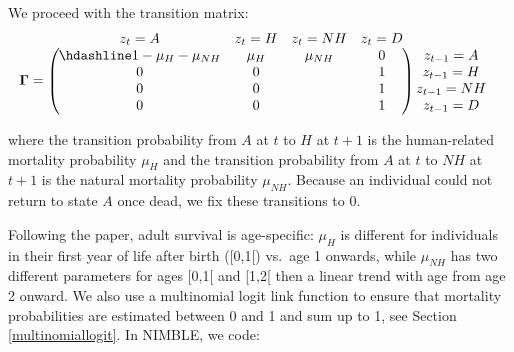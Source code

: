 \documentclass[
  12pt,
]{krantz}
\begin{document}
We proceed with the transition matrix:
\[\begin{matrix}
& \\
\mathbf{\Gamma} =
\left ( \vphantom{ \begin{matrix} 12 \\ 12 \\ 12 \\ 12 \end{matrix} } \right .
\end{matrix}
\hspace{-1.2em}
\begin{matrix}
z_t=A & z_t=H & z_t=NH & z_t=D \\ \hdashline
1 - \mu_H - \mu_{NH}  & \mu_H & \mu_{NH} & 0\\
0 & 0 & &  1\\
0 & 0 & &  1\\
0 & 0 & &  1
\end{matrix}
\hspace{-0.2em}
\begin{matrix}
& \\
\left . \vphantom{ \begin{matrix} 12 \\ 12 \\ 12 \\ 12 \end{matrix} } \right )
\begin{matrix}
z_{t-1}=A \\ z_{t-1}=H \\ z_{t-1}=NH \\ z_{t-1}=D
\end{matrix}
\end{matrix}\]

where the transition probability from \(A\) at \(t\) to \(H\) at \(t + 1\) is the human-related mortality probability \(\mu_H\) and the transition probability from \(A\) at \(t\) to \(NH\) at \(t + 1\) is the natural mortality probability \(\mu_{NH}\). Because an individual could not return to state \(A\) once dead, we fix these transitions to 0.

Following the paper, adult survival is age-specific: \(\mu_H\) is different for individuals in their first year of life after birth ({[}0,1{[}) vs.~age 1 onwards, while \(\mu_{NH}\) has two different parameters for ages {[}0,1{[} and {[}1,2{[} then a linear trend with age from age 2 onward. We also use a multinomial logit link function to ensure that mortality probabilities are estimated between 0 and 1 and sum up to 1, see Section \ref{multinomiallogit}. In NIMBLE, we code:
\end{document}
